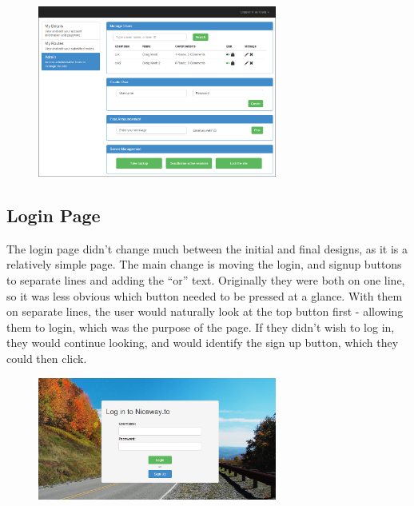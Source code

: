 \documentclass[a4paper,twoside,notitlepage,11pt]{article}
\begin{document}
\begin{figure}[!ht]
	\begin{center}
		\includegraphics[width=0.7\textwidth]{images/final/admin.png}
	\end{center}
	\vspace{-6mm}
\end{figure} 

\subsection{Login Page}
The login page didn't change much between the initial and final designs, as it is a relatively simple page. The main change is moving the login, and signup buttons to separate lines and adding the ``or'' text. Originally they were both on one line, so it was less obvious which button needed to be pressed at a glance. With them on separate lines, the user would naturally look at the top button first - allowing them to login, which was the purpose of the page. If they didn't wish to log in, they would continue looking, and would identify the sign up button, which they could then click.

\begin{figure}[!ht]
	\begin{center}
		\includegraphics[width=0.7\textwidth]{images/final/login.png}
	\end{center}
	\vspace{-6mm}
\end{figure}
\end{document}

